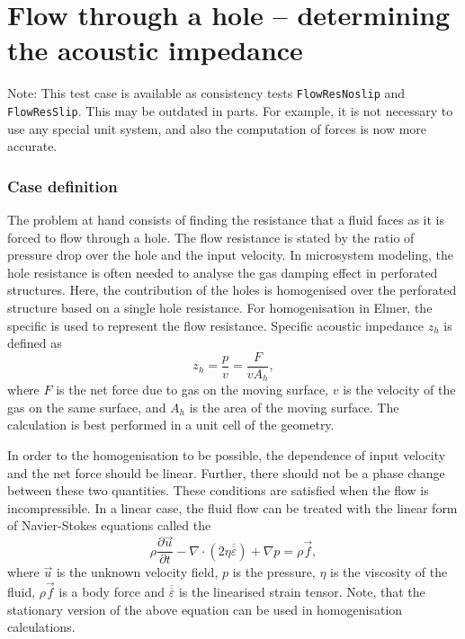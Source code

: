 \chapter{Flow through a hole -- determining the acoustic impedance} 


\noindent
Note: This test case is available as consistency tests 
\texttt{FlowResNoslip} and \texttt{FlowResSlip}. This may be outdated
in parts. For example, it is not necessary to use any special unit system,
and also the computation of forces is now more accurate.

\subsection*{Case definition}

The problem at hand consists of finding the resistance that a fluid
faces as it is forced to flow through a hole. The flow resistance is
stated by the ratio of pressure drop over the hole and the input
velocity. In microsystem modeling, the hole resistance is often needed
to analyse the gas damping effect in perforated structures. Here, the
contribution of the holes is homogenised over the perforated structure
based on a single hole resistance. For homogenisation in Elmer, the
specific  is used to represent the flow
resistance. Specific acoustic impedance $z_h$ is defined as
\begin{equation}
z_h = \frac{p}{v} = \frac{F}{vA_h},
\end{equation}
where $F$ is the net force due to gas on the moving surface, $v$ is
the velocity of the gas on the same surface, and $A_h$ is the area of
the moving surface. The calculation is best performed in a unit cell
of the geometry.

In order to the homogenisation to be possible, the dependence of input
velocity and the net force should be linear. Further, there should not
be a phase change between these two quantities. These conditions are
satisfied when the flow is incompressible.  In a linear case, the
fluid flow can be treated with the linear form of Navier-Stokes
equations called the 
\begin{equation}
\rho\frac{\partial \vec{u}}{\partial t}
-\nabla\cdot(2\eta\overline{\overline{\varepsilon}}) +\nabla p =
\rho \vec{f},
\end{equation}
where $\vec{u}$ is the unknown velocity field, $p$ is the pressure,
$\eta$ is the viscosity of the fluid, $\rho\vec{f}$ is a body force
and $\overline{\overline{\varepsilon}}$ is the linearised strain
tensor. Note, that the stationary version of the above equation can be
used in homogenisation calculations.

